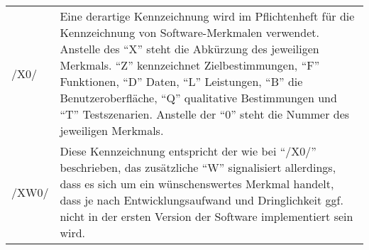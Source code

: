 \begin{tabular}{p{1.5cm}p{14.5cm}}

	/X0/	& Eine derartige Kennzeichnung wird im Pflichtenheft für die Kennzeichnung von Software-Merkmalen verwendet. Anstelle des "`X"' steht die Abkürzung des jeweiligen Merkmals. "`Z"' kennzeichnet Zielbestimmungen, "`F"' Funktionen, "`D"' Daten, "`L"' Leistungen, "`B"' die Benutzeroberfläche, "`Q"' qualitative Bestimmungen und "`T"' Testszenarien. Anstelle der "`0"' steht die Nummer des jeweiligen Merkmals.  \\
	/XW0/	& Diese Kennzeichnung entspricht der wie bei "`/X0/"' beschrieben, das zusätzliche "`W"' signalisiert allerdings, dass es sich um ein wünschenswertes Merkmal handelt, dass je nach Entwicklungsaufwand und Dringlichkeit ggf. nicht in der ersten Version der Software implementiert sein wird. \\

\end{tabular}